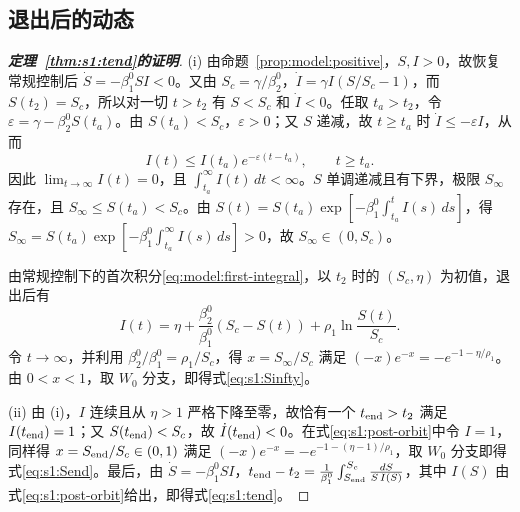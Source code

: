 \subsection{退出后的动态}
\label{sec:proof:post-dynamics}
\begin{proof}[\normalfont\bfseries 定理~\ref{thm:s1:tend}的证明]
(i) 由命题~\ref{prop:model:positive}，$S,I>0$，故恢复常规控制后 $\dot S=-\beta_1^0SI<0$。又由 $S_c=\gamma/\beta_2^0$，$\dot I=\gamma I(S/S_c-1)$，而 $S(t_2)=S_c$，所以对一切 $t>t_2$ 有 $S<S_c$ 和 $\dot I<0$。任取 $t_a>t_2$，令 $\varepsilon=\gamma-\beta_2^0S(t_a)$。由 $S(t_a)<S_c$，$\varepsilon>0$；又 $S$ 递减，故 $t\ge t_a$ 时 $\dot I\le-\varepsilon I$，从而
\[
I(t)\le I(t_a)e^{-\varepsilon(t-t_a)},\qquad t\ge t_a.
\]
因此 $\lim_{t\to\infty}I(t)=0$，且 $\int_{t_a}^{\infty}I(t)\,dt<\infty$。$S$ 单调递减且有下界，极限 $S_\infty$ 存在，且 $S_\infty\le S(t_a)<S_c$。由 $S(t)=S(t_a)\exp[-\beta_1^0\int_{t_a}^tI(s)\,ds]$，得 $S_\infty=S(t_a)\exp[-\beta_1^0\int_{t_a}^{\infty}I(s)\,ds]>0$，故 $S_\infty\in(0,S_c)$。

由常规控制下的首次积分\eqref{eq:model:first-integral}，以 $t_2$ 时的 $(S_c,\eta)$ 为初值，退出后有
\begin{equation}
I(t)=\eta+\frac{\beta_2^0}{\beta_1^0}(S_c-S(t))+\rho_1\ln\frac{S(t)}{S_c}.
\label{eq:s1:post-orbit}
\end{equation}
令 $t\to\infty$，并利用 $\beta_2^0/\beta_1^0=\rho_1/S_c$，得 $x=S_\infty/S_c$ 满足 $(-x)e^{-x}=-e^{-1-\eta/\rho_1}$。由 $0<x<1$，取 $W_0$ 分支，即得式\eqref{eq:s1:Sinfty}。

(ii) 由 (i)，$I$ 连续且从 $\eta>1$ 严格下降至零，故恰有一个 $t_{\rm end}>t_2$ 满足 $I(t_{\rm end})=1$；又 $S(t_{\rm end})<S_c$，故 $\dot I(t_{\rm end})<0$。在式\eqref{eq:s1:post-orbit}中令 $I=1$，同样得 $x=S_{\rm end}/S_c\in(0,1)$ 满足 $(-x)e^{-x}=-e^{-1-(\eta-1)/\rho_1}$，取 $W_0$ 分支即得式\eqref{eq:s1:Send}。最后，由 $\dot S=-\beta_1^0SI$，$t_{\rm end}-t_2=\frac1{\beta_1^0}\int_{S_{\rm end}}^{S_c}\frac{dS}{S\,I(S)}$，其中 $I(S)$ 由式\eqref{eq:s1:post-orbit}给出，即得式\eqref{eq:s1:tend}。
\end{proof}

